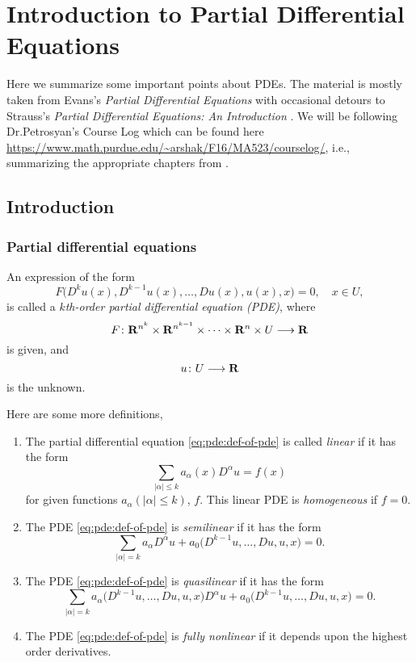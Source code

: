 \chapter{Introduction to Partial Differential Equations}
Here we summarize some important points about PDEs. The material is mostly
taken from Evans's \emph{Partial Differential Equations} \cite{evans} with
occasional detours to Strauss's \emph{Partial Differential Equations: An
  Introduction} \cite{strauss}. We will be following Dr.\@ Petrosyan's
\textsf{Course Log} which can be found here
\url{https://www.math.purdue.edu/~arshak/F16/MA523/courselog/}, i.e.,
summarizing the appropriate chapters from \cite{evans}.

\section{Introduction}
\subsection{Partial differential equations}
\begin{definition}
  An expression of the form
  \begin{equation}
    \label{eq:pde:def-of-pde}
    F\bigl(D^ku(x),D^{k-1}u(x),\dotsc,Du(x),u(x),x\bigr)=0,
    \quad x\in U,
  \end{equation}
  is called a \emph{\(k\)th-order partial differential equation (PDE)},
  where
  \[
    F\colon\mathbf{R}^{n^k}\times\mathbf{R}^{n^{k-1}}\times\dotsb\times\mathbf{R}^n\times U\longrightarrow\mathbf{R}
  \]
  is given, and
  \[
    u\colon U\longrightarrow\mathbf{R}
  \]
  is the unknown.
\end{definition}

Here are some more definitions,
\begin{definition}
  \hfill
  \begin{enumerate}[label=(\roman*)]
  \item The partial differential equation \eqref{eq:pde:def-of-pde} is
    called \emph{linear} if it has the form
    \[
      \sum_{|\alpha|\leq k}a_\alpha(x)D^\alpha u=f(x)
    \]
    for given functions \(a_\alpha(|\alpha|\leq k)\), \(f\). This linear
    PDE is \emph{homogeneous} if \(f=0\).
  \item The PDE \eqref{eq:pde:def-of-pde} is \emph{semilinear} if it has
    the form
    \[
      \sum_{|\alpha|=k}a_\alpha D^\alpha u
      +a_0\bigl(D^{k-1}u,\dotsc,Du,u,x\bigr)=0.
    \]
  \item The PDE \eqref{eq:pde:def-of-pde} is \emph{quasilinear} if it has
    the form
    \[
      \sum_{|\alpha|=k}a_\alpha\bigl(D^{k-1}u,\dotsc,Du,u,x\bigr)D^\alpha u
      +a_0\bigl(D^{k-1}u,\dotsc,Du,u,x\bigr)=0.
    \]
  \item The PDE \eqref{eq:pde:def-of-pde} is \emph{fully nonlinear} if it
    depends upon the highest order derivatives.
  \end{enumerate}
\end{definition}

